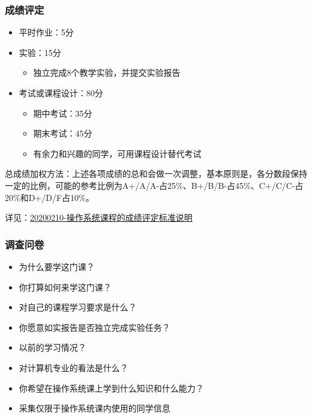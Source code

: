 \documentclass[UTF8]{ctexbeamer}
\begin{document}
\begin{frame}[fragile]
    \frametitle{成绩评定}
    \begin{itemize}
        \item 平时作业：5分
        \item 实验：15分
        \begin{itemize}
            \item 独立完成8个教学实验，并提交实验报告
        \end{itemize}
        \item 考试或课程设计：80分
        \begin{itemize}
            \item 期中考试：35分
            \item 期末考试：45分
            \item 有余力和兴趣的同学，可用课程设计替代考试
        \end{itemize}

    \end{itemize}

    总成绩加权方法：上述各项成绩的总和会做一次调整，基本原则是，各分数段保持一定的比例，可能的参考比例为A+/A/A-占25\%、B+/B/B-占45\%、C+/C/C-占20\%和D+/D/F占10\%。 

    详见：\href{http://os.cs.tsinghua.edu.cn/oscourse/OS2020spring/log#A20200210-.2BZM1PXHz7ft.2BL.2FnoLdoRiEH7pi8RbmmgHUcaL9GYO-}{20200210-操作系统课程的成绩评定标准说明}
    
\end{frame}

    
    \begin{frame}
        \frametitle{调查问卷}
        \begin{itemize}
            \item 为什么要学这门课？
            \item 你打算如何来学这门课？
            \item 对自己的课程学习要求是什么？
            \item 你愿意如实报告是否独立完成实验任务？
            \item 以前的学习情况？
            \item 对计算机专业的看法是什么？
            \item 你希望在操作系统课上学到什么知识和什么能力？
            \item 采集仅限于操作系统课内使用的同学信息
        \end{itemize}
    \end{frame}
\end{document}
